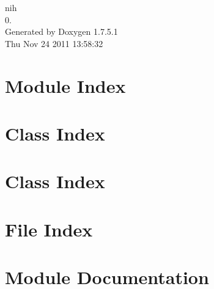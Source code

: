 \documentclass[a4paper]{book}
\begin{document}
\hypersetup{pageanchor=false,citecolor=blue}
\begin{titlepage}
\vspace*{7cm}
\begin{center}
{\Large nih \\[1ex]\large 0. }\\
\vspace*{1cm}
{\large \-Generated by Doxygen 1.7.5.1}\\
\vspace*{0.5cm}
{\small Thu Nov 24 2011 13:58:32}\\
\end{center}
\end{titlepage}
\clearemptydoublepage
{}
\tableofcontents
\clearemptydoublepage
{}
\hypersetup{pageanchor=true,citecolor=blue}
\chapter{\-Module \-Index}

\chapter{\-Class \-Index}

\chapter{\-Class \-Index}

\chapter{\-File \-Index}

\chapter{\-Module \-Documentation}







\end{document}
